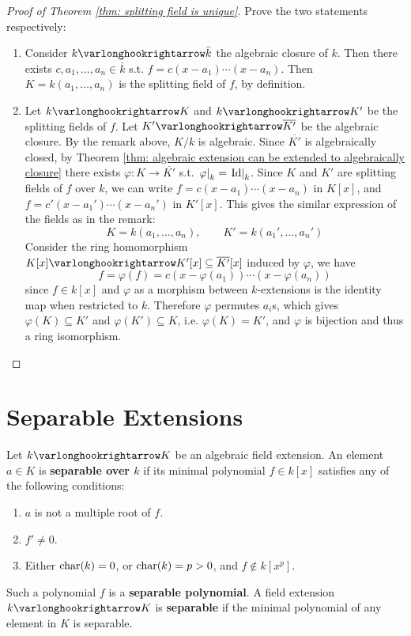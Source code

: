 \documentclass{article}
\begin{document}
\begin{proof}[Proof of Theorem \ref{thm: splitting field is unique}]
    Prove the two statements respectively:
    \begin{enumerate}[label=\arabic*)]
        \item Consider $k \ext \bar{k}$ the algebraic closure of $k$. Then there exists $c, a_1, \dots, a_n \in \bar{k}$ s.t. $f = c(x - a_1) \cdots (x - a_n)$. Then $K = k(a_1, \dots, a_n)$ is the splitting field of $f$, by definition.
        \item Let $k \ext K$ and $k \ext K'$ be the splitting fields of $f$. Let $K' \ext \overline{K'}$ be the algebraic closure. By the remark above, $K/k$ is algebraic. Since $\overline{K'}$ is algebraically closed, by Theorem \ref{thm: algebraic extension can be extended to algebraically closure} there exists $\varphi: K \to \overline{K'}$ s.t. $\left.\varphi\right|_{k} = \left.\mathrm{Id}\right|_{k}$. Since $K$ and $K'$ are splitting fields of $f$ over $k$, we can write $f = c(x - a_1) \cdots (x - a_n)$ in $K[x]$, and $f = c'(x - a_1') \cdots (x - a_n')$ in $K'[x]$. This gives the similar expression of the fields as in the remark: 
        \[
            K = k(a_1, \dots, a_n), \qquad K' = k(a_1', \dots, a_n')
        \]
        Consider the ring homomorphism $K[x] \ext K'[x] \subseteq \overline{K'}[x]$ induced by $\varphi$, we have
        \[
            f = \varphi(f) = c(x - \varphi(a_1)) \cdots (x - \varphi(a_n))
        \]
        since $f \in k[x]$ and $\varphi$ as a morphism between $k$-extensions is the identity map when restricted to $k$. Therefore $\varphi$ permutes $a_i$s, which gives $\varphi(K) \subseteq K'$ and $\varphi(K') \subseteq K$, i.e. $\varphi(K) = K'$, and $\varphi$ is bijection and thus a ring isomorphism.
    \end{enumerate}
\end{proof}

\section{Separable Extensions}

\begin{definition}\label{def: separable extension}
    Let $k \ext K$ be an algebraic field extension. An element $a \in K$ is \textbf{separable over $k$} if its minimal polynomial $f \in k[x]$ satisfies any of the following conditions:
    \begin{enumerate}[label=\arabic*)]
        \item $a$ is not a multiple root of $f$.
        \item $f' \neq 0$.
        \item Either $\mathrm{char}(k) = 0$, or $\mathrm{char}(k) = p > 0$, and $f \notin k[x^p]$.
    \end{enumerate}
    Such a polynomial $f$ is a \textbf{separable polynomial}. A field extension $k \ext K$ is \textbf{separable} if the minimal polynomial of any element in $K$ is separable. 
\end{definition}
\end{document}
